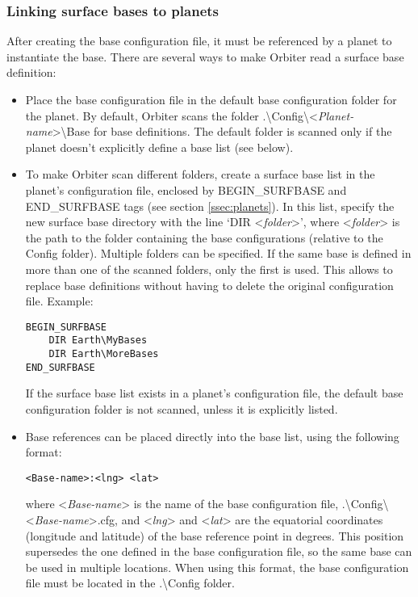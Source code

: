 \documentclass[Orbiter Developer Manual.tex]{subfiles}
\begin{document}
\subsubsection*{Linking surface bases to planets}
After creating the base configuration file, it must be referenced by a planet to instantiate the base. There are several ways to make Orbiter read a surface base definition:

\begin{itemize}
\item Place the base configuration file in the default base configuration folder for the planet. By default, Orbiter scans the folder .\textbackslash Config\textbackslash <\textit{Planet-name}>\textbackslash Base for base definitions. The default folder is scanned only if the planet doesn’t explicitly define a base list (see below).
\item To make Orbiter scan different folders, create a surface base list in the planet’s configuration file, enclosed by BEGIN\_SURFBASE and END\_SURFBASE tags (see section \ref{ssec:planets}). In this list, specify the new surface base directory with the line ‘DIR <\textit{folder}>’, where <\textit{folder}> is the path to the folder containing the base configurations (relative to the Config folder). Multiple folders can be specified. If the same base is defined in more than one of the scanned folders, only the first is used. This allows to replace base definitions without having to delete the original configuration file. Example:

\begin{lstlisting}[language=OSFS]
BEGIN_SURFBASE
	DIR Earth\MyBases
	DIR Earth\MoreBases
END_SURFBASE
\end{lstlisting}

\noindent
If the surface base list exists in a planet’s configuration file, the default base configuration folder is not scanned, unless it is explicitly listed.
\item Base references can be placed directly into the base list, using the following format:\\

\begin{lstlisting}[language=OSFS]
<Base-name>:<lng> <lat>
\end{lstlisting}

\noindent
where <\textit{Base-name}> is the name of the base configuration file, .\textbackslash Config\textbackslash <\textit{Base-name}>.cfg, and <\textit{lng}> and <\textit{lat}> are the equatorial coordinates (longitude and latitude) of the base reference point in degrees. This position supersedes the one defined in the base configuration file, so the same base can be used in multiple locations. When using this format, the base configuration file must be located in the .\textbackslash Config folder.
\end{itemize}
\end{document}
